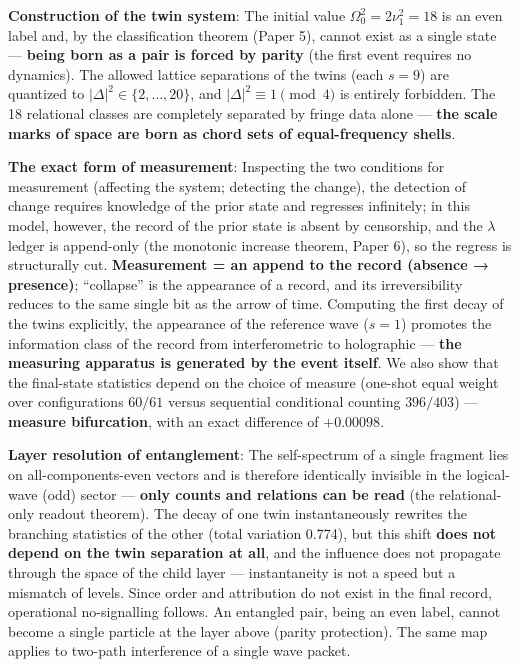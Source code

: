 \documentclass[
]{article}
\begin{document}
\textbf{Construction of the twin system}: The initial value
\(\Omega_0^2=2\nu_1^2=18\) is an even label and, by the classification
theorem (Paper 5), cannot exist as a single state --- \textbf{being born
as a pair is forced by parity} (the first event requires no dynamics).
The allowed lattice separations of the twins (each \(s=9\)) are
quantized to \(|\Delta|^2\in\{2,\ldots,20\}\), and
\(|\Delta|^2\equiv1\pmod4\) is entirely forbidden. The 18 relational
classes are completely separated by fringe data alone --- \textbf{the
scale marks of space are born as chord sets of equal-frequency shells}.

\textbf{The exact form of measurement}: Inspecting the two conditions
for measurement (affecting the system; detecting the change), the
detection of change requires knowledge of the prior state and regresses
infinitely; in this model, however, the record of the prior state is
absent by censorship, and the \(\lambda\) ledger is append-only (the
monotonic increase theorem, Paper 6), so the regress is structurally
cut. \textbf{Measurement = an append to the record (absence →
presence)}; ``collapse'' is the appearance of a record, and its
irreversibility reduces to the same single bit as the arrow of time.
Computing the first decay of the twins explicitly, the appearance of the
reference wave (\(s=1\)) promotes the information class of the record
from interferometric to holographic --- \textbf{the measuring apparatus
is generated by the event itself}. We also show that the final-state
statistics depend on the choice of measure (one-shot equal weight over
configurations \(60/61\) versus sequential conditional counting
\(396/403\)) --- \textbf{measure bifurcation}, with an exact difference
of \(+0.00098\).

\textbf{Layer resolution of entanglement}: The self-spectrum of a single
fragment lies on all-components-even vectors and is therefore
identically invisible in the logical-wave (odd) sector --- \textbf{only
counts and relations can be read} (the relational-only readout theorem).
The decay of one twin instantaneously rewrites the branching statistics
of the other (total variation 0.774), but this shift \textbf{does not
depend on the twin separation at all}, and the influence does not
propagate through the space of the child layer --- instantaneity is not
a speed but a mismatch of levels. Since order and attribution do not
exist in the final record, operational no-signalling follows. An
entangled pair, being an even label, cannot become a single particle at
the layer above (parity protection). The same map applies to two-path
interference of a single wave packet.
\end{document}
